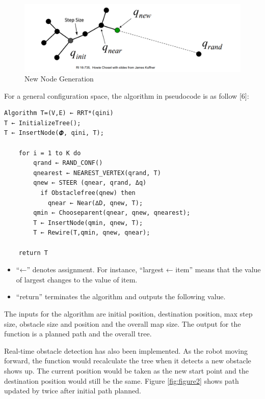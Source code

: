 \documentclass[
  oneside]{ubcthesis}
\providecommand{\tightlist}{%
  \setlength{\itemsep}{0pt}\setlength{\parskip}{0pt}}
\begin{document}
\begin{figure}

{\centering \includegraphics[width=0.6\linewidth]{figures/1} 

}

\caption{New Node Generation}\label{fig:figure1}
\end{figure}



For a general configuration space, the algorithm in pseudocode is as follow {[}6{]}:

\begin{verbatim}
Algorithm T=(V,E) ← RRT*(qini)
T ← InitializeTree();
T ← InsertNode(𝜱, qini, T);

    for i = 1 to K do
        qrand ← RAND_CONF()
        qnearest ← NEAREST_VERTEX(qrand, T)
        qnew ← STEER (qnear, qrand, Δq)
          if Obstaclefree(qnew) then
            qnear ← Near(∆D, qnew, T);
        qmin ← Chooseparent(qnear, qnew, qnearest);
        T ← InsertNode(qmin, qnew, T);
        T ← Rewire(T,qmin, qnew, qnear);
      
    return T
\end{verbatim}

\begin{itemize}
\tightlist
\item
  ``←'' denotes assignment. For instance, ``largest ← item'' means that the value of largest changes to the value of item.
\item
  ``return'' terminates the algorithm and outputs the following value.
\end{itemize}

The inputs for the algorithm are initial position, destination position, max step size, obstacle size and position and the overall map size. The output for the function is a planned path and the overall tree.

Real-time obstacle detection has also been implemented. As the robot moving forward, the function would recalculate the tree when it detects a new obstacle shows up. The current position would be taken as the new start point and the destination position would still be the same. Figure \ref{fig:figure2} shows path updated by twice after initial path planned.
\end{document}
